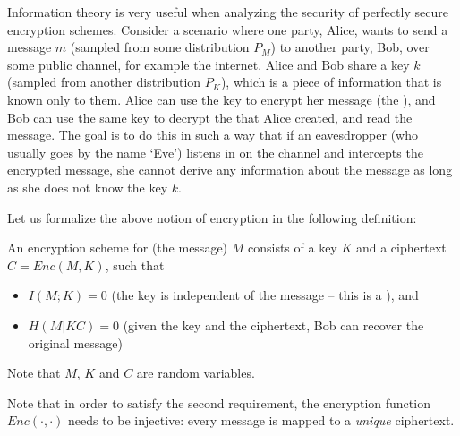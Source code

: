 Information theory is very useful when analyzing the security of perfectly secure encryption schemes. Consider a scenario where one party, Alice, wants to send a message $m$ (sampled from some distribution $P_M$) to another party, Bob, over some public channel, for example the internet. Alice and Bob share a key $k$ (sampled from another distribution $P_K$), which is a piece of information that is known only to them. Alice can use the key to encrypt her message (the ), and Bob can use the same key to decrypt the  that Alice created, and read the message. The goal is to do this in such a way that if an eavesdropper (who usually goes by the name `Eve') listens in on the channel and intercepts the encrypted message, she cannot derive any information about the message as long as she does not know the key $k$.

\begin{center}
\end{center}

Let us formalize the above notion of encryption in the following definition:
\begin{definition}\label{def:encryption}
An encryption scheme for (the message) $M$ consists of a key $K$ and a ciphertext $C = Enc(M,K)$, such that
\begin{itemize}
\item $I(M;K) = 0$ (the key is independent of the message -- this is a ), and
\item $H(M|KC) = 0$ (given the key and the ciphertext, Bob can recover the original message)
\end{itemize}
Note that $M$, $K$ and $C$ are random variables.
\end{definition}
Note that in order to satisfy the second requirement, the encryption function $Enc(\cdot,\cdot)$ needs to be injective: every message is mapped to a \emph{unique} ciphertext.



